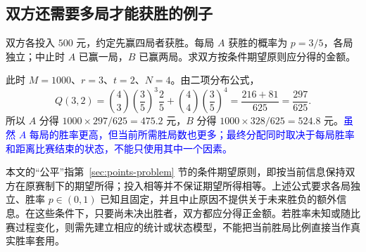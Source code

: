\documentclass[UTF8]{ctexart}
\begin{document}
\subsection{双方还需要多局才能获胜的例子}

\begin{example}[四胜制下的不等胜率分配]
\label{ex:points-biased}
双方各投入 $500$ 元，约定先赢四局者获胜。每局 $A$ 获胜的概率为 $p=3/5$，各局独立；中止时 $A$ 已赢一局，$B$ 已赢两局。求双方按条件期望原则应分得的金额。
\end{example}

\begin{solve}
此时 $M=1000$、$r=3$、$t=2$、$N=4$。由二项分布公式，
\[
  Q(3,2)=\binom43\left(\frac35\right)^3\frac25
          +\binom44\left(\frac35\right)^4
        =\frac{216+81}{625}=\frac{297}{625}.
\]
所以 $A$ 分得 $1000\times297/625=475.2$ 元，$B$ 分得 $1000\times328/625=524.8$ 元。\textcolor{blue}{虽然 $A$ 每局的胜率更高，但当前所需胜局数也更多；最终分配同时取决于每局胜率和距离比赛结束的状态，不能只使用其中一个因素。}
\end{solve}

本文的“公平”指第~\ref{sec:points-problem} 节的条件期望原则，即按当前信息保持双方在原赛制下的期望所得；投入相等并不保证期望所得相等。上述公式要求各局独立、胜率 $p\in(0,1)$ 已知且固定，并且中止原因不提供关于未来胜负的额外信息。在这些条件下，只要尚未决出胜者，双方都应分得正金额。若胜率未知或随比赛过程变化，则需先建立相应的统计或状态模型，不能把当前胜局比例直接当作真实胜率套用。
\end{document}

